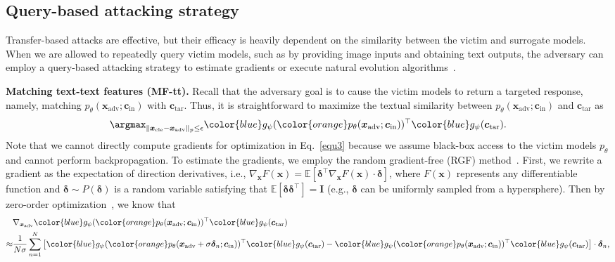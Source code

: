 \subsection{Query-based attacking strategy}
Transfer-based attacks are effective, but their efficacy is heavily dependent on the similarity between the victim and surrogate models. When we are allowed to repeatedly query victim models, such as by providing image inputs and obtaining text outputs, the adversary can employ a query-based attacking strategy to estimate gradients or execute natural evolution algorithms~\citep{bhagoji2018practical,chen2017zoo,ilyas2018black}. 

\textbf{Matching text-text features (MF-tt).} Recall that the adversary goal is to cause the victim models to return a targeted response, namely, matching $p_{\theta}(\boldsymbol{x}_{\text{adv}};\boldsymbol{c}_{\text{in}})$ with $\boldsymbol{c}_{\text{tar}}$. Thus, it is straightforward to maximize the textual similarity between $p_{\theta}(\boldsymbol{x}_{\text{adv}};\boldsymbol{c}_{\text{in}})$ and $\boldsymbol{c}_{\text{tar}}$ as
\begin{equation}
    \argmax_{\|\boldsymbol{x}_{\text{cle}}-\boldsymbol{x}_{\text{adv}}\|_{p}\leq \epsilon} {\color{blue}g_{\psi}}({\color{orange}p_\theta}(\boldsymbol{x}_\text{adv};\boldsymbol{c}_{\text{in}}))^{\top}{\color{blue}g_{\psi}}(\boldsymbol{c}_{\text{tar}})\textrm{.}
    \label{equ3}
\end{equation}
Note that we cannot directly compute gradients for optimization in Eq.~\eqref{equ3} because we assume black-box access to the victim models $p_\theta$ and cannot perform backpropagation. To estimate the gradients, we employ the random gradient-free (RGF) method~\citep{nesterov2017random}. First, we rewrite a gradient as the expectation of direction derivatives, i.e., $\nabla_{\boldsymbol{x}}F(\boldsymbol{x})=\mathbb{E}\left[\boldsymbol{\delta}^{\top}\nabla_{\boldsymbol{x}} F(\boldsymbol{x})\cdot \boldsymbol{\delta}\right]$, where $F(\boldsymbol{x})$ represents any differentiable function and $\boldsymbol{\delta}\sim P(\boldsymbol{\delta})$ is a random variable satisfying that $\mathbb{E}[\boldsymbol{\delta}\boldsymbol{\delta}^{\top}]=\mathbf{I}$ (e.g., $\boldsymbol{\delta}$ can be uniformly sampled from a hypersphere). Then by zero-order optimization~\citep{chen2017zoo}, we know that
\begin{equation}
    \begin{split}
        &\nabla_{\boldsymbol{x}_\text{adv}}{\color{blue}g_{\psi}}({\color{orange}p_\theta}(\boldsymbol{x}_\text{adv};\boldsymbol{c}_{\text{in}}))^{\top}{\color{blue}g_{\psi}}(\boldsymbol{c}_{\text{tar}})\\
        \approx& \frac{1}{N\sigma}\sum_{n=1}^{N}\left[{\color{blue}g_{\psi}}({\color{orange}p_\theta}(\boldsymbol{x}_\text{adv}+\sigma \boldsymbol{\delta}_{n};\boldsymbol{c}_{\text{in}}))^{\top}{\color{blue}g_{\psi}}(\boldsymbol{c}_{\text{tar}})-{\color{blue}g_{\psi}}({\color{orange}p_\theta}(\boldsymbol{x}_\text{adv};\boldsymbol{c}_{\text{in}}))^{\top}{\color{blue}g_{\psi}}(\boldsymbol{c}_{\text{tar}})\right]\cdot \boldsymbol{\delta}_{n}\textrm{,}
    \end{split}
    \label{equ4}
\end{equation}
